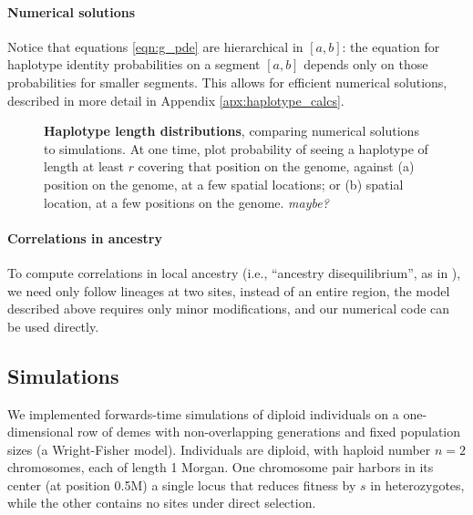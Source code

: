 \documentclass[12pt]{article}
\newcommand{\plr}[1]{{\em \color{blue} #1}}
\begin{document}
\paragraph{Numerical solutions}
Notice that equations \eqref{eqn:g_pde}
are hierarchical in $[a,b]$:
the equation for haplotype identity probabilities on a segment $[a,b]$ depends only on those probabilities for smaller segments.
This allows for efficient numerical solutions,
described in more detail in Appendix \ref{apx:haplotype_calcs}.

\begin{figure}
    \begin{center}
    \end{center}
    \caption{
        \textbf{Haplotype length distributions},
        comparing numerical solutions to simulations.
        At one time, plot 
        probability of seeing a haplotype of length at least $r$ covering that position on the genome,
        against (a) position on the genome, at a few spatial locations;
        or (b) spatial location, at a few positions on the genome.
        \plr{maybe?}
        \label{fig:haplotype_lengths}
    }
\end{figure}

\paragraph{Correlations in ancestry}
To compute correlations in local ancestry
(i.e., ``ancestry disequilibrium'', as in \citet{Pool2015,brandvainthisvolume}),
we need only follow lineages at two sites, instead of an entire region,
the model described above requires only minor modifications,
and our numerical code can be used directly.


\subsection*{Simulations}

We implemented forwards-time simulations of diploid individuals on a one-dimensional row of demes
with non-overlapping generations and fixed population sizes (a Wright-Fisher model). Individuals are diploid, with haploid number $n=2$ chromosomes, each of length 1 Morgan. One chromosome pair harbors in its center (at position 0.5M) a single locus that reduces fitness by $s$ in heterozygotes, while the other contains no sites under direct selection.
\end{document}
